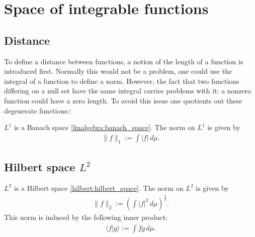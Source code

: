 \section{Space of integrable functions}
\subsection{Distance}

    To define a distance between functions, a notion of the length of a function is introduced first. Normally this would not be a problem, one could use the integral of a function to define a norm. However, the fact that two functions differing on a null set have the same integral carries problems with it: a nonzero function could have a zero length. To avoid this issue one quotients out these degenerate functions::
    \begin{property}
        $L^1$ is a Banach space \ref{linalgebra:banach_space}. The norm on $L^1$ is given by
        \begin{gather}
            \label{lebesgue:L1_norm}
            \|f\|_1 := \int|f|\,d\mu.
        \end{gather}
    \end{property}

\subsection{Hilbert space \texorpdfstring{$L^2$}{L2}}\label{section:hilbert_space}

    \begin{property}\label{lebesgue:L2_hilbert_space}
        $L^2$ is a Hilbert space \ref{hilbert:hilbert_space}. The norm on $L^2$ is given by
        \begin{gather}
            \label{lebesgue:L2_norm}
            \|f\|_2 := \left(\int|f|^2\,d\mu\right)^{\frac{1}{2}}.
        \end{gather}
        This norm is induced by the following inner product:
        \begin{gather}
            \label{lebesgue:L2_inner_product}
            \langle f|g \rangle := \int\overline{f}g\,d\mu.
        \end{gather}
    \end{property}

